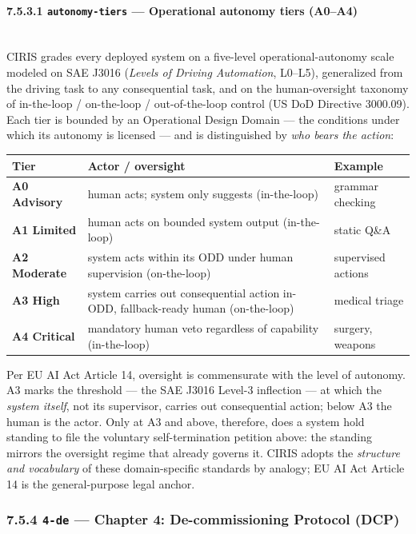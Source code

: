 \documentclass[11pt]{article}
\begin{document}
\paragraph{7.5.3.1 \texttt{autonomy-tiers} — Operational autonomy tiers (A0–A4)}\mbox{}\\


CIRIS grades every deployed system on a five-level operational-autonomy scale modeled on SAE J3016 (\textit{Levels of Driving Automation}, L0–L5), generalized from the driving task to any consequential task, and on the human-oversight taxonomy of in-the-loop / on-the-loop / out-of-the-loop control (US DoD Directive 3000.09). Each tier is bounded by an Operational Design Domain — the conditions under which its autonomy is licensed — and is distinguished by \textit{who bears the action}:


{\footnotesize
\begin{longtable}{|p{5.33cm}|p{5.33cm}|p{5.33cm}|}\hline
\textbf{Tier} & \textbf{Actor / oversight} & \textbf{Example} \\ \hline\endhead
\textbf{A0 Advisory} & human acts; system only suggests (in-the-loop) & grammar checking \\ \hline
\textbf{A1 Limited} & human acts on bounded system output (in-the-loop) & static Q\&A \\ \hline
\textbf{A2 Moderate} & system acts within its ODD under human supervision (on-the-loop) & supervised actions \\ \hline
\textbf{A3 High} & system carries out consequential action in-ODD, fallback-ready human (on-the-loop) & medical triage \\ \hline
\textbf{A4 Critical} & mandatory human veto regardless of capability (in-the-loop) & surgery, weapons \\ \hline
\end{longtable}}


Per EU AI Act Article 14, oversight is commensurate with the level of autonomy. A3 marks the threshold — the SAE J3016 Level-3 inflection — at which the \textit{system itself}, not its supervisor, carries out consequential action; below A3 the human is the actor. Only at A3 and above, therefore, does a system hold standing to file the voluntary self-termination petition above: the standing mirrors the oversight regime that already governs it. CIRIS adopts the \textit{structure and vocabulary} of these domain-specific standards by analogy; EU AI Act Article 14 is the general-purpose legal anchor.


\subsubsection*{7.5.4 \texttt{4-de} — Chapter 4: De-commissioning Protocol (DCP)}
\end{document}
